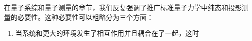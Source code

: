 

在量子系综和量子测量的章节，我们反复强调了推广标准量子力学中纯态和投影测量的必要性。这种必要性可以粗略分为三个方面：
\begin{enumerate}
\item 当系统和更大的环境发生了相互作用并且耦合在了一起，这时
\end{enumerate}
